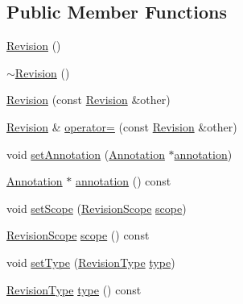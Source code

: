 \subsection*{Public Member Functions}
\begin{DoxyCompactItemize}
\item 
\hyperlink{classOkular_1_1Annotation_1_1Revision_a143928cf671b50b7499da6b17ca9870e}{Revision} ()
\item 
\hyperlink{classOkular_1_1Annotation_1_1Revision_a9931e609cc9c26d9bd80e239ac724eec}{$\sim$\+Revision} ()
\item 
\hyperlink{classOkular_1_1Annotation_1_1Revision_ae769473f0c798cb30678c24a66b35e2d}{Revision} (const \hyperlink{classOkular_1_1Annotation_1_1Revision}{Revision} \&other)
\item 
\hyperlink{classOkular_1_1Annotation_1_1Revision}{Revision} \& \hyperlink{classOkular_1_1Annotation_1_1Revision_abf18bb80dc7a84d7d5d2f62d74fb31aa}{operator=} (const \hyperlink{classOkular_1_1Annotation_1_1Revision}{Revision} \&other)
\item 
void \hyperlink{classOkular_1_1Annotation_1_1Revision_a603e0e104f21d2d9eaa63526c65e38ff}{set\+Annotation} (\hyperlink{classOkular_1_1Annotation}{Annotation} $\ast$\hyperlink{classOkular_1_1Annotation_1_1Revision_ad6ba67028710fbe858e2deeb6b6b2aa4}{annotation})
\item 
\hyperlink{classOkular_1_1Annotation}{Annotation} $\ast$ \hyperlink{classOkular_1_1Annotation_1_1Revision_ad6ba67028710fbe858e2deeb6b6b2aa4}{annotation} () const 
\item 
void \hyperlink{classOkular_1_1Annotation_1_1Revision_a327f88072bfa9e168f7707d074a3fe21}{set\+Scope} (\hyperlink{classOkular_1_1Annotation_a9f71f811fcd4d3524e199e7eee4b6390}{Revision\+Scope} \hyperlink{classOkular_1_1Annotation_1_1Revision_a3eb43b2d5cb012f056f8e87012a3e3c2}{scope})
\item 
\hyperlink{classOkular_1_1Annotation_a9f71f811fcd4d3524e199e7eee4b6390}{Revision\+Scope} \hyperlink{classOkular_1_1Annotation_1_1Revision_a3eb43b2d5cb012f056f8e87012a3e3c2}{scope} () const 
\item 
void \hyperlink{classOkular_1_1Annotation_1_1Revision_a2ce88a1c549a6823c152e9784bc125b0}{set\+Type} (\hyperlink{classOkular_1_1Annotation_a76de7f3bda49c63bd319763c6ac46bd3}{Revision\+Type} \hyperlink{classOkular_1_1Annotation_1_1Revision_ac0d4eb3d727f3eda5486f314f9ff645e}{type})
\item 
\hyperlink{classOkular_1_1Annotation_a76de7f3bda49c63bd319763c6ac46bd3}{Revision\+Type} \hyperlink{classOkular_1_1Annotation_1_1Revision_ac0d4eb3d727f3eda5486f314f9ff645e}{type} () const 
\end{DoxyCompactItemize}


